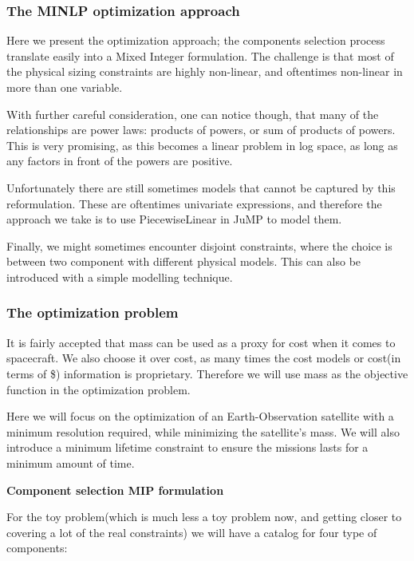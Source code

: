 \documentclass[11pt]{article}
\begin{document}
\hypertarget{the-minlp-optimization-approach}{%
\subsubsection{The MINLP optimization
approach}\label{the-minlp-optimization-approach}}

Here we present the optimization approach; the components selection
process translate easily into a Mixed Integer formulation. The challenge
is that most of the physical sizing constraints are highly non-linear,
and oftentimes non-linear in more than one variable.

With further careful consideration, one can notice though, that many of
the relationships are power laws: products of powers, or sum of products
of powers. This is very promising, as this becomes a linear problem in
log space, as long as any factors in front of the powers are positive.

Unfortunately there are still sometimes models that cannot be captured
by this reformulation. These are oftentimes univariate expressions, and
therefore the approach we take is to use PiecewiseLinear in JuMP to
model them.

Finally, we might sometimes encounter disjoint constraints, where the
choice is between two component with different physical models. This can
also be introduced with a simple modelling technique.

\hypertarget{the-optimization-problem}{%
\subsubsection{The optimization
problem}\label{the-optimization-problem}}

It is fairly accepted that mass can be used as a proxy for cost when it
comes to spacecraft. We also choose it over cost, as many times the cost
models or cost(in terms of \$) information is proprietary. Therefore we
will use mass as the objective function in the optimization problem.

Here we will focus on the optimization of an Earth-Observation satellite
with a minimum resolution required, while minimizing the satellite's
mass. We will also introduce a minimum lifetime constraint to ensure the
missions lasts for a minimum amount of time.

\textbf{Component selection MIP formulation}

For the toy problem(which is much less a toy problem now, and getting
closer to covering a lot of the real constraints) we will have a catalog
for four type of components:
\end{document}
